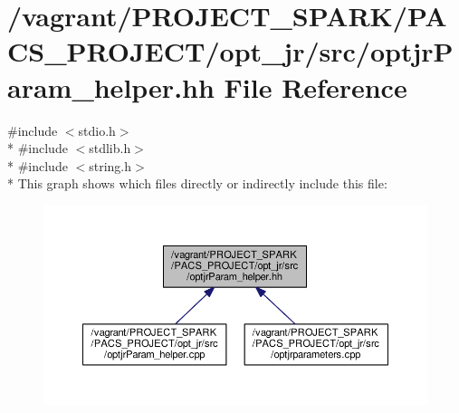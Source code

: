 \hypertarget{optjrParam__helper_8hh}{\section{/vagrant/\-P\-R\-O\-J\-E\-C\-T\-\_\-\-S\-P\-A\-R\-K/\-P\-A\-C\-S\-\_\-\-P\-R\-O\-J\-E\-C\-T/opt\-\_\-jr/src/optjr\-Param\-\_\-helper.hh File Reference}
\label{optjrParam__helper_8hh}
}
{\ttfamily \#include $<$stdio.\-h$>$}\\*
{\ttfamily \#include $<$stdlib.\-h$>$}\\*
{\ttfamily \#include $<$string.\-h$>$}\\*
This graph shows which files directly or indirectly include this file\-:\nopagebreak
\begin{figure}[H]
\begin{center}
\leavevmode
\includegraphics[width=350pt]{optjrParam__helper_8hh__dep__incl}
\end{center}
\end{figure}
